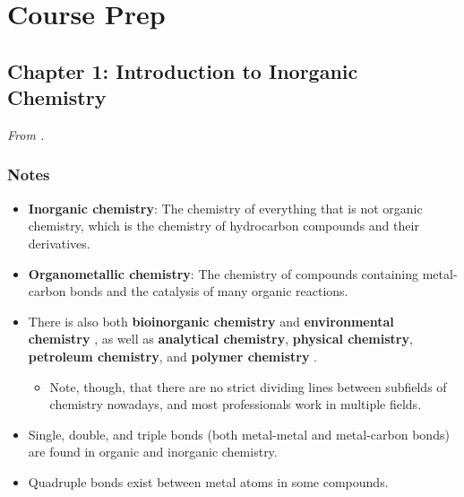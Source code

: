 \documentclass[../main.tex]{subfiles}
\begin{document}
\chapter{Course Prep}
\section{Chapter 1: Introduction to Inorganic Chemistry}
\emph{From \textcite{bib:MiesslerFischerTarr}.}
\subsection{Notes}
\begin{itemize}
    \item {}\textbf{Inorganic chemistry}: The chemistry of everything that is not organic chemistry, which is the chemistry of hydrocarbon compounds and their derivatives.
    \item \textbf{Organometallic chemistry}: The chemistry of compounds containing metal-carbon bonds and the catalysis of many organic reactions.
    \item There is also both \textbf{bioinorganic chemistry} and \textbf{environmental chemistry} \parencite[1]{bib:MiesslerFischerTarr}, as well as \textbf{analytical chemistry}, \textbf{physical chemistry}, \textbf{petroleum chemistry}, and \textbf{polymer chemistry} \parencite[4]{bib:MiesslerFischerTarr}.
    \begin{itemize}
        \item Note, though, that there are no strict dividing lines between subfields of chemistry nowadays, and most professionals work in multiple fields.
    \end{itemize}
    \item Single, double, and triple bonds (both metal-metal and metal-carbon bonds) are found in organic and inorganic chemistry.
    \item Quadruple bonds exist between metal atoms in some compounds.
    \begin{figure}[h!]
        \centering
        \begin{subfigure}[b]{0.3\linewidth}
            \centering
\end{subfigure}
\end{figure}
\end{itemize}
\end{document}
